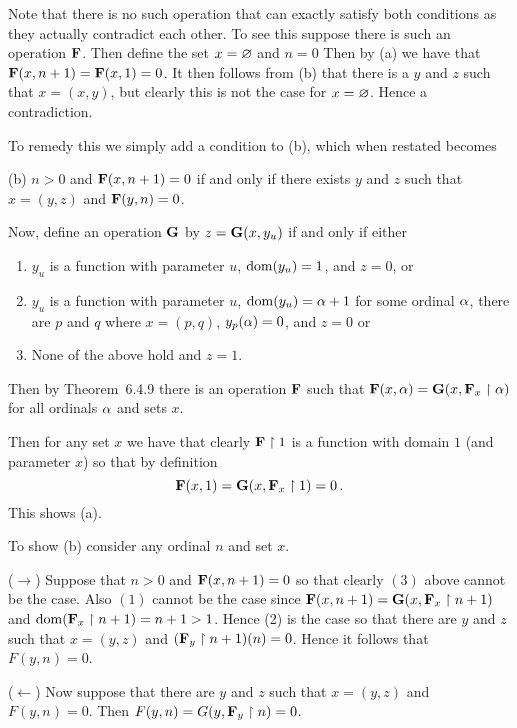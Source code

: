 \begin{solution}
    \def\G{\prop{G}}
    \def\F{\prop{F}}
    Note that there is no such operation that can exactly satisfy both conditions as they actually contradict each other.
    To  see this suppose there is such an operation $\F$.
    Then define the set $x = \varnothing$ and $n = 0$
    Then by (a) we have that $\F(x,n+1) = \F(x, 1) = 0$.
    It then follows from (b) that there is a $y$ and $z$ such that $x = (x,y)$, but clearly this is not the case for $x=\varnothing$.
    Hence a contradiction.

    To remedy this we simply add a condition to (b), which when restated becomes

    (b) $n > 0$ and $\F(x,n+1) = 0$ if and only if there exists $y$ and $z$ such that $x = (y,z)$ and $\F(y,n) = 0$.

	Now, define an operation $\G$ by $z = \G(x,y_u)$ if and only if either
    \begin{enumerate}
        \item $y_u$ is a function with parameter $u$, $\mathrm{dom}(y_u) = 1$, and $z = 0$, or
        \item $y_u$ is a function with parameter $u$, $\mathrm{dom}(y_u) = \alpha+1$ for some ordinal $\alpha$, there are $p$ and $q$ where $x = (p,q)$, $y_p(\alpha) = 0$, and $z = 0$ or
        \item None of the above hold and $z = 1$.
    \end{enumerate}

    Then by Theorem~6.4.9 there is an operation $\F$ such that $\F(x,\a) = \G(x, \F_x \rest \a)$ for all ordinals $\alpha$ and sets $x$.

    Then for any set $x$ we have that clearly $\F \rest 1$ is a function with domain $1$ (and parameter $x$) so that by definition
    $$
    \F(x,1) = \G(x, \F_x \rest 1) = 0 \,.
    $$
    This shows (a).

    To show (b) consider any ordinal $n$ and set $x$.

    ($\to$) Suppose that $n > 0$ and $\F(x,n+1) = 0$ so that clearly $(3)$ above cannot be the case.
    Also $(1)$ cannot be the case since $\F(x,n+1) = \G(x, \F_x \rest n+1)$ and $\dom(\F_x \rest n+1) = n + 1 > 1$.
    Hence (2) is the case so that there are $y$ and $z$ such that $x = (y,z)$ and $(\F_y \rest n+1)(n) = 0$.
    Hence it follows that $F(y,n) = 0$.

    ($\leftarrow$) Now suppose that there are $y$ and $z$ such that $x = (y,z)$ and $F(y,n) = 0$.
    Then $F(y,n) = G(y, \F_y \rest n) = 0$.


\end{solution}
